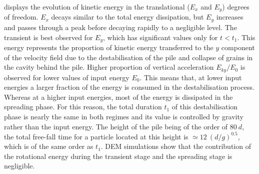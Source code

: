  displays the evolution of kinetic energy 
in the translational ($E_x$ and $E_y$) degrees of freedom. $E_x$ decays similar 
to the total energy dissipation, but $E_y$ increases and passes through a peak 
before decaying rapidly to a negligible level. The transient is best 
observed for $E_y$, which has significant values only for $t< t_1$. This energy 
represents the proportion of kinetic energy transferred to the $y$ component of 
the velocity field  due to the destabilisation of the pile and collapse of 
grains in the cavity behind the pile. Higher proportion of vertical 
acceleration $E_{ky}/E_0$ is observed for lower values of input energy $E_0$. 
This means that, at lower input energies a larger fraction of the energy is 
consumed in the destabilisation process. Whereas at a higher input energies, 
most of the energy is dissipated in the spreading phase. For this reason, the 
total duration $t_1$ of this destabilisation phase is nearly the same in 
both regimes and its value is controlled by gravity rather than the input 
energy. The height of the pile being of the order of $80 \ d$, the total 
free-fall time for a particle located at this height is $\simeq 12 \ 
(d/g)^{0.5}$, which is of the same order as $t_1$. DEM simulations show that 
the contribution of the rotational energy during the transient stage and the 
spreading stage is negligible. 

